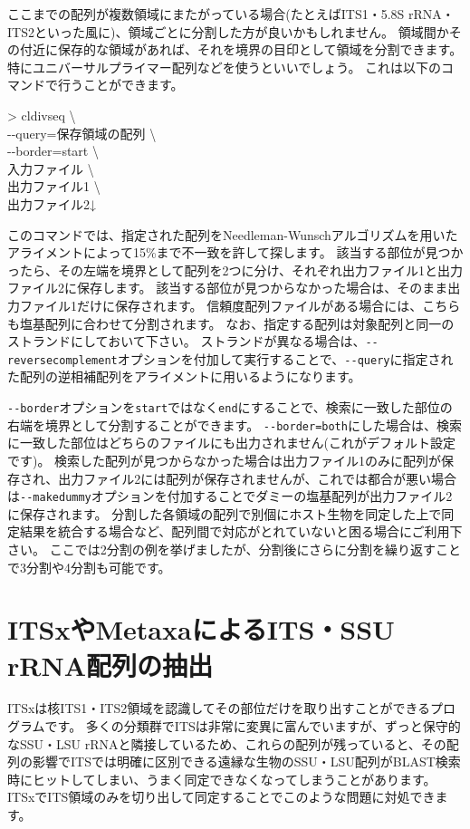 \documentclass[titlepage,10pt,a4paper]{jsbook}
\newenvironment{cmd}{\begin{oframed}\raggedright\ttfamily\footnotesize\setlength{\baselineskip}{1.4em}}{\end{oframed}\vspace{-1em}}
\begin{document}
ここまでの配列が複数領域にまたがっている場合(たとえばITS1・5.8S rRNA・ITS2といった風に)、領域ごとに分割した方が良いかもしれません。
領域間かその付近に保存的な領域があれば、それを境界の目印として領域を分割できます。
特にユニバーサルプライマー配列などを使うといいでしょう。
これは以下のコマンドで行うことができます。
\begin{cmd}
{\textgreater} cldivseq {\textbackslash}\\
{-}{-}query=保存領域の配列 {\textbackslash}\\
{-}{-}border=start {\textbackslash}\\
入力ファイル {\textbackslash}\\
出力ファイル1 {\textbackslash}\\
出力ファイル2↓
\end{cmd}
このコマンドでは、指定された配列をNeedleman-Wunschアルゴリズムを用いたアライメントによって15\%まで不一致を許して探します。
該当する部位が見つかったら、その左端を境界として配列を2つに分け、それぞれ出力ファイル1と出力ファイル2に保存します。
該当する部位が見つからなかった場合は、そのまま出力ファイル1だけに保存されます。
信頼度配列ファイルがある場合には、こちらも塩基配列に合わせて分割されます。
なお、指定する配列は対象配列と同一のストランドにしておいて下さい。
ストランドが異なる場合は、\texttt{{-}{-}reversecomplement}オプションを付加して実行することで、\texttt{{-}{-}query}に指定された配列の逆相補配列をアライメントに用いるようになります。

\texttt{{-}{-}border}オプションを\texttt{start}ではなく\texttt{end}にすることで、検索に一致した部位の右端を境界として分割することができます。
\texttt{{-}{-}border=both}にした場合は、検索に一致した部位はどちらのファイルにも出力されません(これがデフォルト設定です)。
検索した配列が見つからなかった場合は出力ファイル1のみに配列が保存され、出力ファイル2には配列が保存されませんが、これでは都合が悪い場合は\texttt{{-}{-}makedummy}オプションを付加することでダミーの塩基配列が出力ファイル2に保存されます。
分割した各領域の配列で別個にホスト生物を同定した上で同定結果を統合する場合など、配列間で対応がとれていないと困る場合にご利用下さい。
ここでは2分割の例を挙げましたが、分割後にさらに分割を繰り返すことで3分割や4分割も可能です。

\section{ITSxやMetaxaによるITS・SSU rRNA配列の抽出}

ITSxは核ITS1・ITS2領域を認識してその部位だけを取り出すことができるプログラムです\citep{Bengtsson2013}。
多くの分類群でITSは非常に変異に富んでいますが、ずっと保守的なSSU・LSU rRNAと隣接しているため、これらの配列が残っていると、その配列の影響でITSでは明確に区別できる遠縁な生物のSSU・LSU配列がBLAST検索時にヒットしてしまい、うまく同定できなくなってしまうことがあります。
ITSxでITS領域のみを切り出して同定することでこのような問題に対処できます。
\end{document}
